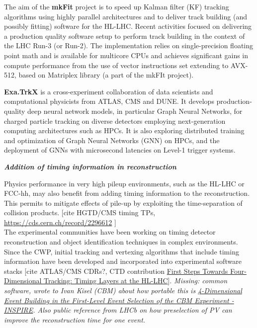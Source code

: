 \documentclass[11pt,a4paper]{article}
\begin{document}
The aim of the \textbf{mkFit} project is to speed up Kalman filter (KF)
tracking algorithms using highly parallel architectures and to deliver
track building (and possibly fitting) software for the HL-LHC. Recent
activities focused on delivering a production quality software setup to
perform track building in the context of the LHC Run-3 (or Run-2). The
implementation relies on single-precision floating point math and is
available for multicore CPUs and achieves significant gains in compute
performance from the use of vector instructions set extending to
AVX-512, based on Matriplex library (a part of the mkFIt project).

\textbf{Exa.TrkX} is a cross-experiment collaboration of data scientists
and computational physicists from ATLAS, CMS and DUNE. It develops
production-quality deep neural network models, in particular Graph
Neural Networks, for charged particle tracking on diverse detectors
employing next-generation computing architectures such as HPCs. It is
also exploring distributed training and optimization of Graph Neural
Networks (GNN) on HPCs, and the deployment of GNNs with microsecond
latencies on Level-1 trigger systems.

\emph{\textbf{\hfill\break
Addition of timing information in reconstruction}}

Physics performance in very high pileup environments, such as the HL-LHC
or FCC-hh, may also benefit from adding timing information to the
reconstruction. This permits to mitigate effects of pile-up by
exploiting the time-separation of collision products. {[}cite HGTD/CMS
timing TPs,
\href{https://cds.cern.ch/record/2296612}{{https://cds.cern.ch/record/2296612}}
{]}\\
The experimental communities have been working on timing detector
reconstruction and object identification techniques in complex
environments. Since the CWP, initial tracking and vertexing algorithms
that include timing information have been developed and incorporated
into experimental software stacks {[}cite ATLAS/CMS CDRs?, CTD
contribution
\href{https://indico.cern.ch/event/658267/contributions/2870293/attachments/1620243/2577412/TimingCTD_LindseyGray_20032018.pdf}{{First
Steps Towards Four-Dimensional Tracking: Timing Layers at the
HL-LHC}}{]}. \emph{Missing: common software, wrote to Ivan Kisel (CBM)
about how portable this is
\href{https://inspirehep.net/literature/1414007}{{4-Dimensional Event
Building in the First-Level Event Selection of the CBM Experiment -
INSPIRE}}. Also public reference from LHCb on how preselection of PV can
improve the reconstruction time for one event.}
\end{document}
